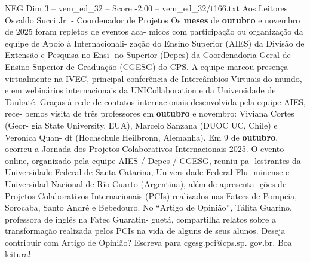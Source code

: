 \begin{textsample}{NEG Dim 3 – vem\_ed\_32 – Score -2.00 – vem\_ed\_32/t166.txt}  \label{ex:f3_neg_003}
Aos Leitores Osvaldo Succi Jr. - Coordenador de Projetos Os \textbf{meses} de \textbf{outubro} e novembro de 2025 foram repletos de eventos aca- micos com participação ou organização da equipe de Apoio à Internacionali- zação do Ensino Superior (AIES) da Divisão de Extensão e Pesquisa no Ensi- no Superior (Depes) da Coordenadoria Geral de Ensino Superior de Graduação (CGESG) do CPS.
A equipe marcou presença virtualmente na IVEC, principal conferência de Intercâmbios Virtuais do mundo, e em webinários internacionais da UNICollaboration e da Universidade de Taubaté.
Graças à rede de contatos internacionais desenvolvida pela equipe AIES, rece- bemos visita de três professores em \textbf{outubro} e novembro: Viviana Cortes (Geor- gia State University, EUA), Marcelo Sanzana (DUOC UC, Chile) e Veronica Quan- dt (Hochschule Heilbronn, Alemanha).
Em 9 de \textbf{outubro}, ocorreu a Jornada dos Projetos Colaborativos Internacionais 2025.
O evento online, organizado pela equipe AIES / Depes / CGESG, reuniu pa- lestrantes da Universidade Federal de Santa Catarina, Universidade Federal Flu- minense e Universidad Nacional de Río Cuarto (Argentina), além de apresenta- ções de Projetos Colaborativos Internacionais (PCIs) realizados nas Fatecs de Pompeia, Sorocaba, Santo André e Bebedouro.
No “Artigo de Opinião”, Tálita Guarino, professora de inglês na Fatec Guaratin- guetá, compartilha relatos sobre a transformação realizada pelos PCIs na vida de alguns de seus alunos.
Deseja contribuir com Artigo de Opinião?
Escreva para cgesg.pci@cps.sp. gov.br.
Boa leitura!

\end{textsample}
